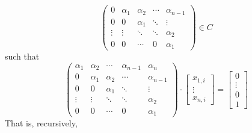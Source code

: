 \begin{example}
\[\begin{pmatrix}
		0&\alpha_1&\alpha_2&\cdots&\alpha_{n-1}\\
		0&0&\alpha_1&\ddots&\vdots\\		
		\vdots&\vdots&\ddots&\ddots&\alpha_2\\
		0&0&\cdots&0&\alpha_1
	\end{pmatrix}
	\in
	C
\]
such that
\[
	\begin{pmatrix}
		\alpha_1&\alpha_2&\cdots&\alpha_{n-1}&\alpha_n\\
		0&\alpha_1&\alpha_2&\cdots&\alpha_{n-1}\\
		0&0&\alpha_1&\ddots&\vdots\\		
		\vdots&\vdots&\ddots&\ddots&\alpha_2\\
		0&0&\cdots&0&\alpha_1
	\end{pmatrix}
	\cdot
	\begin{bmatrix}
		x_{1,i}\\
		\vdots\\
		x_{n,i}
	\end{bmatrix}
	=
	\begin{bmatrix}
		0\\
		\vdots\\
		0\\
		1
	\end{bmatrix}	
\] 
That is, recursively, 


\end{example}
